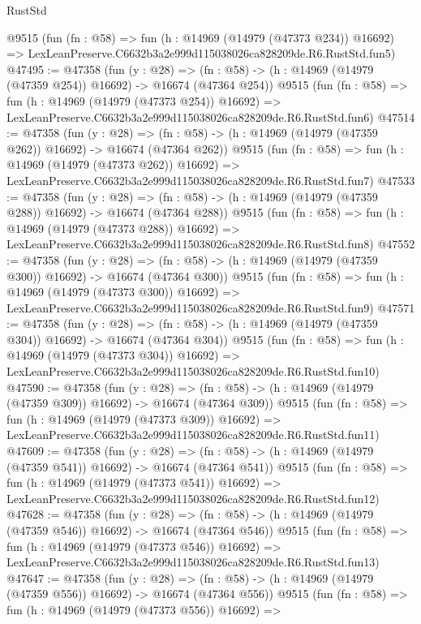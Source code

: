 \begin{lexlean}{RustStd}
\begin{coremodule}
    @9515
    (fun (fn : @58) =>
    fun (h : @14969 (@14979 (@47373 @234)) @16692) =>
    LexLeanPreserve.C6632b3a2e999d115038026ca828209de.R6.RustStd.fun5)
@47495 := @47358
    (fun (y : @28) =>
    (fn : @58) -> (h : @14969 (@14979 (@47359 @254)) @16692) -> @16674 (@47364 @254))
    @9515
    (fun (fn : @58) =>
    fun (h : @14969 (@14979 (@47373 @254)) @16692) =>
    LexLeanPreserve.C6632b3a2e999d115038026ca828209de.R6.RustStd.fun6)
@47514 := @47358
    (fun (y : @28) =>
    (fn : @58) -> (h : @14969 (@14979 (@47359 @262)) @16692) -> @16674 (@47364 @262))
    @9515
    (fun (fn : @58) =>
    fun (h : @14969 (@14979 (@47373 @262)) @16692) =>
    LexLeanPreserve.C6632b3a2e999d115038026ca828209de.R6.RustStd.fun7)
@47533 := @47358
    (fun (y : @28) =>
    (fn : @58) -> (h : @14969 (@14979 (@47359 @288)) @16692) -> @16674 (@47364 @288))
    @9515
    (fun (fn : @58) =>
    fun (h : @14969 (@14979 (@47373 @288)) @16692) =>
    LexLeanPreserve.C6632b3a2e999d115038026ca828209de.R6.RustStd.fun8)
@47552 := @47358
    (fun (y : @28) =>
    (fn : @58) -> (h : @14969 (@14979 (@47359 @300)) @16692) -> @16674 (@47364 @300))
    @9515
    (fun (fn : @58) =>
    fun (h : @14969 (@14979 (@47373 @300)) @16692) =>
    LexLeanPreserve.C6632b3a2e999d115038026ca828209de.R6.RustStd.fun9)
@47571 := @47358
    (fun (y : @28) =>
    (fn : @58) -> (h : @14969 (@14979 (@47359 @304)) @16692) -> @16674 (@47364 @304))
    @9515
    (fun (fn : @58) =>
    fun (h : @14969 (@14979 (@47373 @304)) @16692) =>
    LexLeanPreserve.C6632b3a2e999d115038026ca828209de.R6.RustStd.fun10)
@47590 := @47358
    (fun (y : @28) =>
    (fn : @58) -> (h : @14969 (@14979 (@47359 @309)) @16692) -> @16674 (@47364 @309))
    @9515
    (fun (fn : @58) =>
    fun (h : @14969 (@14979 (@47373 @309)) @16692) =>
    LexLeanPreserve.C6632b3a2e999d115038026ca828209de.R6.RustStd.fun11)
@47609 := @47358
    (fun (y : @28) =>
    (fn : @58) -> (h : @14969 (@14979 (@47359 @541)) @16692) -> @16674 (@47364 @541))
    @9515
    (fun (fn : @58) =>
    fun (h : @14969 (@14979 (@47373 @541)) @16692) =>
    LexLeanPreserve.C6632b3a2e999d115038026ca828209de.R6.RustStd.fun12)
@47628 := @47358
    (fun (y : @28) =>
    (fn : @58) -> (h : @14969 (@14979 (@47359 @546)) @16692) -> @16674 (@47364 @546))
    @9515
    (fun (fn : @58) =>
    fun (h : @14969 (@14979 (@47373 @546)) @16692) =>
    LexLeanPreserve.C6632b3a2e999d115038026ca828209de.R6.RustStd.fun13)
@47647 := @47358
    (fun (y : @28) =>
    (fn : @58) -> (h : @14969 (@14979 (@47359 @556)) @16692) -> @16674 (@47364 @556))
    @9515
    (fun (fn : @58) =>
    fun (h : @14969 (@14979 (@47373 @556)) @16692) =>

\end{coremodule}
\end{lexlean}
